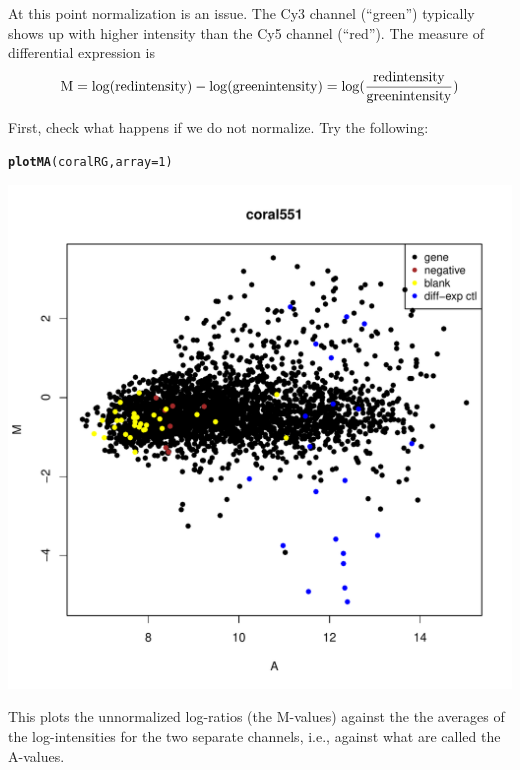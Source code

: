 \documentclass[a4paper,9pt]{article}\usepackage[]{graphicx}\usepackage[]{color}
\makeatletter
\def\maxwidth{ %
  \ifdim\Gin@nat@width>\linewidth
    \linewidth
  \else
    \Gin@nat@width
  \fi
}
\newcommand{\hlnum}[1]{\textcolor[rgb]{0.686,0.059,0.569}{#1}}%
\newcommand{\hlstd}[1]{\textcolor[rgb]{0.345,0.345,0.345}{#1}}%
\newcommand{\hlkwc}[1]{\textcolor[rgb]{0.333,0.667,0.333}{#1}}%
\newcommand{\hlkwd}[1]{\textcolor[rgb]{0.737,0.353,0.396}{\textbf{#1}}}%
\newenvironment{kframe}{%
 \def\at@end@of@kframe{}%
 \ifinner\ifhmode%
  \def\at@end@of@kframe{\end{minipage}}%
  \begin{minipage}{\columnwidth}%
 \fi\fi%
 \def\FrameCommand##1{\hskip\@totalleftmargin \hskip-\fboxsep
 \colorbox{shadecolor}{##1}\hskip-\fboxsep
     \hskip-\linewidth \hskip-\@totalleftmargin \hskip\columnwidth}%
 \MakeFramed {\advance\hsize-\width
   \@totalleftmargin\z@ \linewidth\hsize
   \@setminipage}}%
 {\par\unskip\endMakeFramed%
 \at@end@of@kframe}
\newenvironment{knitrout}{}{} %
\makeatother
\begin{document}
At this point normalization is an issue.  The Cy3 channel (``green'')
typically shows up with higher intensity than the Cy5 channel
(``red'').  The measure of differential expression is\[
{\rm M} = \log({\rm red intensity}) - \log({\rm green intensity}) =
\log(\frac{\displaystyle \rm red intensity}
{\displaystyle \rm green intensity})
\]

First, check what happens if we do not normalize.
Try the following:
\begin{knitrout}
\color{fgcolor}\begin{kframe}
\begin{alltt}
\hlkwd{plotMA}\hlstd{(coralRG,} \hlkwc{array}\hlstd{=}\hlnum{1}\hlstd{)}
\end{alltt}
\end{kframe}
\includegraphics[width=\maxwidth]{figure/unnamed-chunk-7-1} 

\end{knitrout}
This plots the unnormalized log-ratios (the M-values) against the
the averages of the log-intensities for the two separate channels,
i.e., against what are called the A-values.
\end{document}
